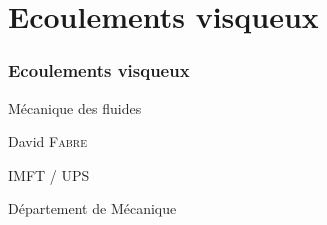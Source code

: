 



\part{Ecoulements visqueux}
\section{Ecoulements visqueux}



\begin{frame}

  \color{bleu}

  \begin{flushleft}
    
    \Large
   	\bf
    
    Mécanique des fluides 

  \end{flushleft}
  

  \begin{flushright}

    \rm

    \textrm{David} \textsc{Fabre}
    
    \vspace{3mm}
    
    IMFT / UPS
    
    Département de Mécanique
    

  \end{flushright}


\end{frame}
